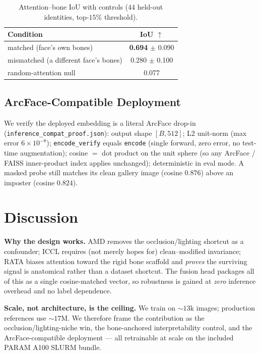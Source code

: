 \documentclass[10pt,conference]{IEEEtran}
\begin{document}
\begin{table}[t]
\centering
\caption{Attention--bone IoU with controls ($44$ held-out identities,
top-$15\%$ threshold).}
\label{tab:iou}
\begin{tabular}{lc}
\toprule
Condition & IoU $\uparrow$ \\
\midrule
matched (face's own bones)        & \textbf{0.694} $\pm$ 0.090 \\
mismatched (a different face's bones) & 0.280 $\pm$ 0.100 \\
random-attention null             & 0.077 \\
\bottomrule
\end{tabular}
\end{table}

\subsection{ArcFace-Compatible Deployment}
\label{sec:deploy}
We verify the deployed embedding is a literal ArcFace drop-in
(\texttt{inference\_compat\_proof.json}): output shape $[B,512]$; L2 unit-norm
(max error $6\!\times\!10^{-8}$); \texttt{encode\_verify} equals
\texttt{encode} (single forward, zero error, no test-time augmentation);
cosine $=$ dot product on the unit sphere (so any ArcFace / FAISS
inner-product index applies unchanged); deterministic in eval mode. A masked
probe still matches its clean gallery image (cosine $0.876$) above an imposter
(cosine $0.824$).

\section{Discussion}
\label{sec:discussion}

\textbf{Why the design works.} AMD removes the occlusion/lighting shortcut as a
confounder; ICCL requires (not merely hopes for) clean--modified invariance;
RATA biases attention toward the rigid bone scaffold and \emph{proves} the
surviving signal is anatomical rather than a dataset shortcut. The fusion head
packages all of this as a single cosine-matched vector, so robustness is gained
at \emph{zero} inference overhead and no label dependence.

\textbf{Scale, not architecture, is the ceiling.} We train on $\sim\!13$k
images; production references use $\sim\!17$M. We therefore frame the
contribution as the occlusion/lighting-niche win, the bone-anchored
interpretability control, and the ArcFace-compatible deployment --- all
retrainable at scale on the included PARAM A100 SLURM bundle.
\end{document}
